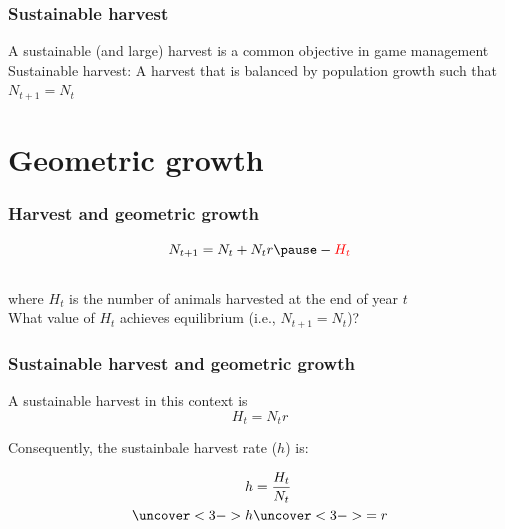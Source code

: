 \documentclass[color=usenames,dvipsnames]{beamer}\usepackage[]{graphicx}\usepackage[]{color}
\begin{document}










\begin{frame}
  \frametitle{Sustainable harvest}
  \large
  {%
    A sustainable (and large) harvest is a common
    objective in game management}
  \vfill
  \pause
  {%
    Sustainable harvest:}
    A harvest that is balanced by population growth such that $N_{t+1}
    = N_t$
\end{frame}





\section{Geometric growth}




\begin{frame}
  \frametitle{Harvest and geometric growth}
  \Large
  \[
   N_{t+1} = N_t + N_tr \pause - \color{red}{H_t}
  \] \\
  \pause
  \large
  where $H_t$ is the number of animals harvested at the end of year $t$ \\
  \pause
  \vfill %
  What value of $H_t$ achieves equilibrium (i.e., $N_{t+1} = N_t$)?  \\
\end{frame}




\begin{frame}
  \frametitle{Sustainable harvest and geometric growth}
  \large
  A sustainable harvest in this context is
  \LARGE
  \[
    H_t = N_tr
  \]
  \pause
  \large
  \vfill
  {%
    Consequently, the sustainbale harvest rate ($h$) is: \par}
  \LARGE
  \begin{align*}
    h &= \frac{H_t}{N_t} \\
    \uncover<3->{h}  &\uncover<3->{= r} \\
  \end{align*}
\end{frame}
\end{document}
